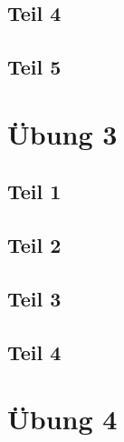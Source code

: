 \documentclass[a4paper,10pt]{article}
\begin{document}
\subsection*{Teil 4}

\subsection*{Teil 5}

\section*{Übung 3}

\subsection*{Teil 1}

\subsection*{Teil 2}

\subsection*{Teil 3}

\subsection*{Teil 4}

\section*{Übung 4}
\end{document}
